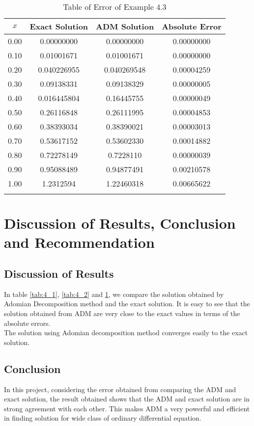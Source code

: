 \documentclass[11pt]{report}
\newcommand{\NI}{\noindent}
\begin{document}
	\newpage
	\begin{longtable}{|c|c|c|c|}
		\hline
		$x$ & Exact Solution & ADM Solution & Absolute Error\\\hline
		0.00 & 0.00000000 & 0.00000000 & 0.00000000\\
		0.10 & 0.01001671 & 0.01001671 & 0.00000000\\
		0.20 & 0.040226955 & 0.040269548 & 0.00004259\\
		0.30 & 0.09138331 & 0.09138329 & 0.00000005\\
		0.40 & 0.016445804 & 0.16445755 & 0.00000049\\
		0.50 & 0.26116848 & 0.26111995 & 0.00004853\\
		0.60 & 0.38393034 & 0.38390021 & 0.00003013\\
		0.70 & 0.53617152 & 0.53602330 & 0.00014882\\
		0.80 & 0.72278149 & 0.7228110 & 0.00000039\\
		0.90 & 0.95088489 & 0.94877491 & 0.00210578\\
		1.00 & 1.2312594 & 1.22460318 & 0.00665622\\\hline
		\caption{Table of Error of Example 4.3}\label{tab:4_3}
	\end{longtable}
	
	\chapter{Discussion of Results, Conclusion and Recommendation}
	\section{Discussion of Results}
	In table \ref{tab:4_1}, \ref{tab:4_2} and \ref{tab:4_3}, we compare the solution obtained by Adomian Decomposition method and the exact solution. It is easy to see that the solution obtained from ADM are very close to the exact values in terms of the absolute errors.\\
	
	\NI The solution using Adomian decomposition method converges easily to the exact solution.
	
	\section{Conclusion}
	In this project, considering the error obtained from comparing the ADM and exact solution, the result obtained shows that the ADM and exact solution are in strong agreement with each other. This makes ADM a very powerful and efficient in finding solution for wide class of ordinary differential equation.
	
\end{document}
